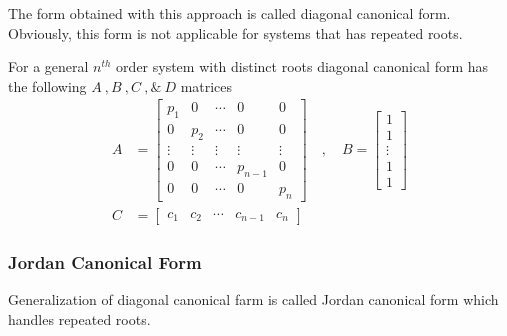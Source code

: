 \documentclass[twoside]{article}
\begin{document}
The form obtained with this approach is called
diagonal canonical form. Obviously, this form is
not applicable for systems that has repeated roots.

For a general $n^{th}$ order system with distinct
roots diagonal canonical form has the following 
$A \ ,  B \ ,  C \ , \& \ D$ matrices
%
\begin{align*}
A &= \left[ \begin{array}{ccccc} p_1 & 0 & \cdots & 0 & 0
              \\ 0 & p_2 & \cdots & 0 & 0
\\ \vdots & \vdots & \vdots & \vdots & \vdots
\\ 0 & 0 & \cdots & p_{n-1} & 0
    \\ 0 & 0 & \cdots & 0 & p_n \end{array} \right]
\quad , \quad 
B = \left[ \begin{array}{c} 1 \\ 1 \\ \vdots \\ 1 \\  1
\end{array} \right]
\\ C &= \left[ \begin{array}{ccccc} c_1 & c_2 & \cdots &  c_{n-1} & c_n \end{array} \right]
\end{align*}
%

\subsubsection*{Jordan Canonical Form}

Generalization of diagonal canonical
farm is called Jordan canonical form
which handles repeated roots.
\end{document}
